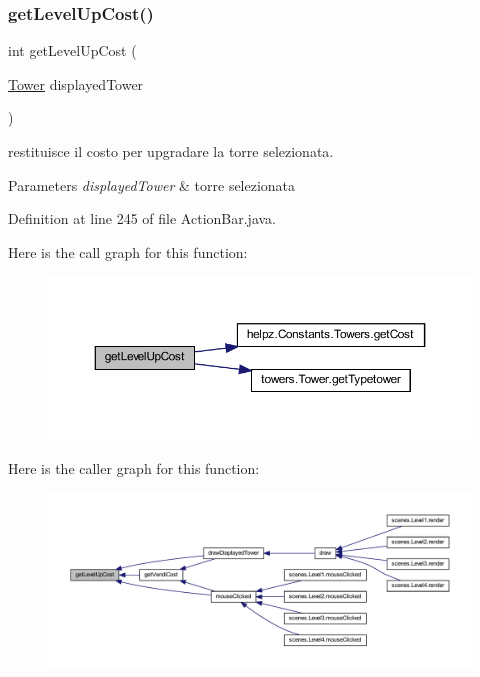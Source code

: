 \subsubsection{\texorpdfstring{get\+Level\+Up\+Cost()}{getLevelUpCost()}}
{\footnotesize\ttfamily int get\+Level\+Up\+Cost (\begin{DoxyParamCaption}\item[{\hyperlink{classtowers_1_1_tower}{Tower}}]{displayed\+Tower }\end{DoxyParamCaption})}



restituisce il costo per upgradare la torre selezionata. 


\begin{DoxyParams}{Parameters}
{\em displayed\+Tower} & torre selezionata \\
\hline
\end{DoxyParams}


Definition at line 245 of file Action\+Bar.\+java.

Here is the call graph for this function\+:\nopagebreak
\begin{figure}[H]
\begin{center}
\leavevmode
\includegraphics[width=350pt]{classui_1_1_action_bar_a6c5f59282a148a0d74bc5aa58d5ad307_cgraph}
\end{center}
\end{figure}
Here is the caller graph for this function\+:\nopagebreak
\begin{figure}[H]
\begin{center}
\leavevmode
\includegraphics[width=350pt]{classui_1_1_action_bar_a6c5f59282a148a0d74bc5aa58d5ad307_icgraph}
\end{center}
\end{figure}
\mbox{\label{classui_1_1_action_bar_aef810268cda93505da735c6c81136e00}} 
